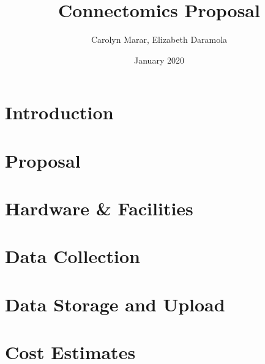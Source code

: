 \documentclass{article}
\title{Connectomics Proposal}
\author{Carolyn Marar, Elizabeth Daramola }
\date{January 2020}
\begin{document}
\maketitle

\section{Introduction}

\section{Proposal}

\section{Hardware & Facilities}

\section{Data Collection}

\section{Data Storage and Upload}

\section{Cost Estimates}
\end{document}
